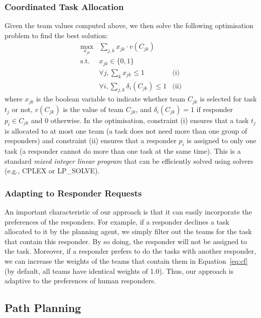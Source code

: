 \subsubsection{Coordinated Task Allocation}
Given the team values computed above, we then solve the following
optimisation problem to find the best solution:
\begin{equation}
  \begin{array}{lll}
    \max\limits_{x_{jk}} & \sum_{j, k} x_{jk} \cdot v(C_{jk}) & \\[2pt]
    \mbox{s.t.} & x_{jk} \in \{0, 1\} & \\[2pt]
    & \forall j, \sum_{k} x_{jk} \leq 1 & \mbox{(i)} \\[2pt]
    & \forall i, \sum_{j, k} \delta_i(C_{jk}) \leq 1 & \mbox{(ii)}
  \end{array}
  \label{eq:cf}
\end{equation}
where $x_{jk}$ is the boolean variable to indicate whether team
$C_{jk}$ is selected for task $t_j$ or not, $v(C_{jk})$ is the
value of team $C_{jk}$, and $\delta_i(C_{jk}) = 1$ if responder
$p_i\in C_{jk}$ and 0 otherwise. In the optimisation, constraint
(i) ensures that a task $t_j$ is allocated to at most one team (a
task does not need more than one group of responders) and
constraint (ii) ensures that a responder $p_i$ is assigned to only
one task (a responder cannot do more than one task at the same
time). This is a standard {\em mixed integer linear program} that
can be efficiently solved using solvers (e.g., CPLEX or LP\_SOLVE).

\subsubsection{Adapting to Responder Requests}\label{sec:adaptive}
An important characteristic of our approach is that it can easily
incorporate the preferences of the responders. For example, if a
responder declines a task allocated to it by the planning agent, we
simply filter out the teams for the task that contain this
responder. By so doing, the responder will not be assigned to the
task. Moreover, if a responder prefers to do the tasks with another
responder, we can increase the weights of the teams that contain
them in Equation~\ref{eq:cf} (by default, all teams have identical
weights of 1.0). Thus, our approach is adaptive to the
 preferences of human responders.

\subsection{Path Planning}
\label{sec:pathplanning}

